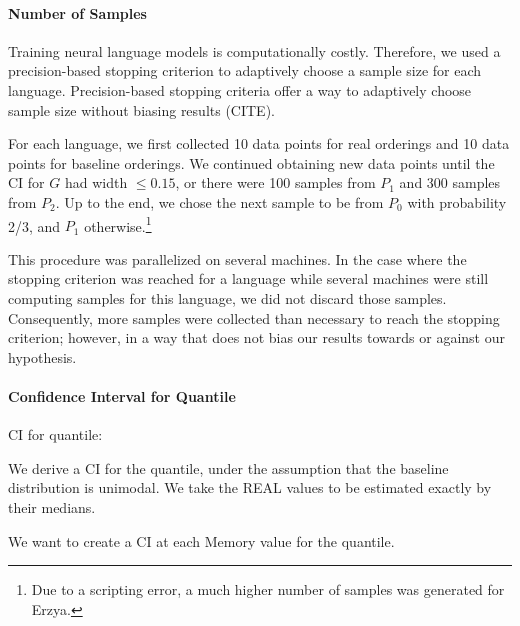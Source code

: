 \documentclass[11pt,letterpaper]{article}
\begin{document}
%


\paragraph{Number of Samples}
Training neural language models is computationally costly.
Therefore, we used a precision-based stopping criterion to adaptively choose a sample size for each language.
Precision-based stopping criteria offer a way to adaptively choose sample size without biasing results (CITE).

For each language, we first collected 10 data points for real orderings and 10 data points for baseline orderings.
We continued obtaining new data points until the CI for $G$ had width $\leq 0.15$, or there were 100 samples from $P_1$ and 300 samples from $P_2$.
Up to the end, we chose the next sample to be from $P_0$ with probability 2/3, and $P_1$ otherwise.\footnote{Due to a scripting error, a much higher number of samples was generated for Erzya.}

This procedure was parallelized on several machines.
In the case where the stopping criterion was reached for a language while several machines were still computing samples for this language, we did not discard those samples.
Consequently, more samples were collected than necessary to reach the stopping criterion; however, in a way that does not bias our results towards or against our hypothesis.



\paragraph{Confidence Interval for Quantile}
CI for quantile: %

We derive a CI for the quantile, under the assumption that the baseline distribution is unimodal. We take the REAL values to be estimated exactly by their medians.

We want to create a CI at each Memory value for the quantile.
\end{document}
